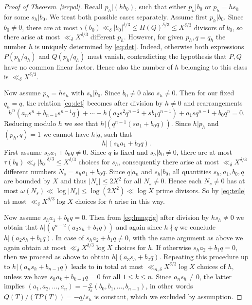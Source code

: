 \documentclass[12pt]{amsart}
\theoremstyle{definition}
\begin{document}
\begin{proof}[Proof of Theorem~\ref{irrpol}]
Recall $p_{h}\vert (hb_{0})$, such that 
either $p_{h}\vert b_{0}$ or $p_{h}=hs_{h}$ 
for some $s_{h}\vert b_{0}$.
We treat both possible cases separately. Assume first
$p_{h}\vert b_{0}$. Since $b_{0}\neq 0$,
there are at most 
$\tau(b_{0})\ll_{\delta} \vert b_{0}\vert^{\delta/3}\leq 
H(Q)^{\delta/3}\leq X^{\delta/3}$
divisors of $b_{0}$, so there arise at most
$\ll_{\delta} X^{\delta/3}$ different $p_{h}$. However,
for given $p_{h},q=q_{h}$ the number $h$ is uniquely 
determined by \eqref{eq:det}. Indeed, otherwise both expressions
$P(p_{h}/q_{h})$ and $Q(p_{h}/q_{h})$
must vanish, contradicting 
the hypothesis that $P,Q$ have no common linear factor.
Hence also
the number of $h$ belonging to this class is $\ll_{\delta} X^{\delta/3}$.

Now assume $p_{h}=hs_{h}$ with $s_{h}\vert b_{0}$. 
Since $b_{0}\neq 0$ also $s_{h}\neq 0$. Then 
for our fixed $q_{h}=q$, the relation \eqref{eq:det} becomes
after division by $h\neq 0$ and rearrangements
%
\begin{equation} \label{eq:hungrig}
h^{n}(a_{n}s^{n}+b_{n-1}s^{n-1}q)+\cdots+
h(a_{2}s^{2}q^{n-2}+sb_{1}q^{n-1})+a_{1}sq^{n-1}+b_{0}q^{n}=0.
\end{equation}
%
Reducing modulo $h$ we see that $h\vert (q^{n-1}(sa_{1}+b_{0}q))$.
Since $h\vert p_{h}$ and $(p_{h},q)=1$ we cannot 
have $h\vert q$, such that
%
\begin{equation} \label{eq:teile}
h\vert (s_{h}a_{1}+b_{0}q).
\end{equation}
%
First assume $s_{h}a_{1}+b_{0}q\neq 0$.
Since $q$ is fixed and $s_{h}\vert b_{0}\neq 0$, there are at most 
$\tau(b_{0})\ll_{\delta} \vert b_{0}\vert^{\delta/3}\leq X^{\delta/3}$
choices for $s_{h}$, consequently 
there arise at most $\ll_{\delta} X^{\delta/3}$ different
numbers $N_{s}=s_{h}a_{1}+b_{0}q$. 
Since $q\vert a_{n}$ and $s_{h}\vert b_{0}$, all
quantities $s_{h},a_{1},b_{0},q$ are bounded by $X$
and thus $\vert N_{s}\vert\leq 2X^{2}$ for all $N_{s}\neq 0$.
Hence each $N_{s}\neq 0$ has at most 
$\omega(N_{s})\ll \log \vert N_{s}\vert\leq \log(2X^{2})\ll \log X$ 
prime divisors. So by \eqref{eq:teile}
at most $\ll_{\delta} X^{\delta/3} \log X$ choices for $h$ arise 
in this way.

Now assume $s_{h}a_{1}+b_{0}q=0$. Then from \eqref{eq:hungrig} 
after division by $hs_{h}\neq 0$ we obtain 
that $h\vert (q^{n-2}(a_{2}s_{h}+b_{1}q))$
and again since $h\nmid q$ we conclude $h\vert (a_{2}s_{h}+b_{1}q)$.
In case of $s_{h}a_{2}+b_{1}q\neq 0$, with the same argument 
as above we again obtain at most 
$\ll_{\delta} X^{\delta/3} \log X$ choices for $h$. 
If otherwise $s_{h}a_{2}+b_{1}q=0$,
then we proceed as above to obtain $h\vert (a_{3}s_{h}+b_{2}q)$. 
Repeating this procedure up to $h\vert (a_{n}s_{h}+b_{n-1}q)$
leads to in total at most 
$\ll_{n,\delta} X^{\delta/3} \log X$ choices of $h$, unless we have
$s_{h}a_{k}+b_{k-1}q=0$ for all $1\leq k\leq n$. 
Since $a_{n}s_{h}\neq 0$, the latter implies
$(a_{1},a_{2},\ldots,a_{n})=-\frac{q}{s_{h}}(b_{0},b_{1},\ldots,b_{n-1})$, in other words
$Q(T)/(TP(T))=-q/s_{h}$ is constant, which 
we excluded by assumption.


\end{proof}
\end{document}
